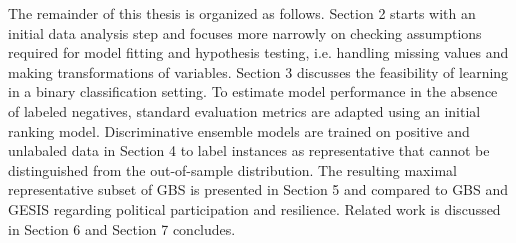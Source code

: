 The remainder of this thesis is organized as follows. Section 2 starts with an initial data analysis step and focuses more narrowly on checking assumptions required for model fitting and hypothesis testing, i.e. handling missing values and making transformations of variables. Section 3 discusses the feasibility of learning in a binary classification setting. To estimate model performance in the absence of labeled negatives, standard evaluation metrics are adapted using an initial ranking model. Discriminative ensemble models are trained on positive and unlabaled data in Section 4 to label instances as representative that cannot be distinguished from the out-of-sample distribution. The resulting maximal representative subset of GBS is presented in Section 5 and compared to GBS and GESIS regarding political participation and resilience. Related work is discussed in Section 6 and Section 7 concludes.
